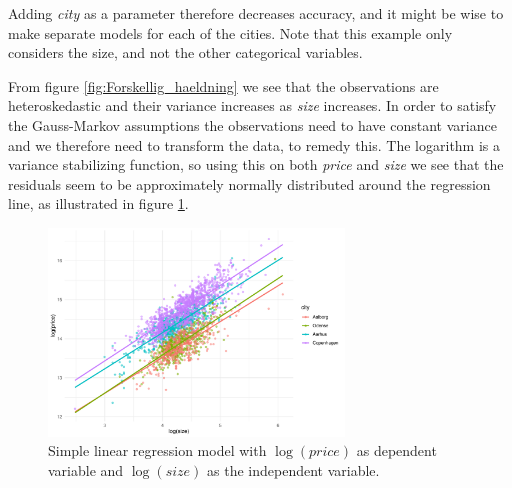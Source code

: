 Adding \textit{city} as a parameter therefore decreases accuracy, and it might be wise to make separate models for each of the cities. 
Note that this example only considers the size, and not the other categorical variables.



From figure \ref{fig:Forskellig_haeldning} we see that the observations are heteroskedastic and their variance increases as \textit{size} increases. 
In order to satisfy the Gauss-Markov assumptions the observations need to have constant variance and we therefore need to transform the data, to remedy this. 
The logarithm is a variance stabilizing function, so using this on both \textit{price} and \textit{size} we see that the residuals seem to be approximately normally distributed around the regression line, as illustrated in figure \ref{fig:Log_Model_plot}. 

\begin{figure}[H] 
    \centering
    \includegraphics[width = 0.7\textwidth]{figures/Nanna/Plot_forskellig_haeldning.pdf}
    \caption{Simple linear regression model with $\log(price)$ as dependent variable and $\log(size)$ as the independent variable.}
    \label{fig:Log_Model_plot}
\end{figure}

